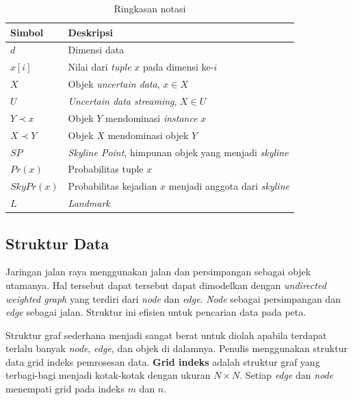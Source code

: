 \documentclass[conference]{IEEEtran}
\begin{document}
\begin{table}[htbp]
	\caption{Ringkasan notasi}
	\begin{center}
		\begin{tabular}{| p{2cm} | p{5cm} |}
		\hline
		\textbf{Simbol} & \textbf{Deskripsi} \\ \hline
		$ d $ & Dimensi data \\ \hline
		$ x[i] $ & Nilai dari \textit{tuple} $ x $ pada dimensi ke-$ i $  \\ \hline
		$ X $ & Objek \textit{uncertain data}, $ x \in X $ \\ \hline
		$ U $ & \textit{Uncertain data streaming}, $ X \in U $ \\ \hline
		$ Y \prec x $ & Objek $ Y $ mendominasi \textit{instance} $ x $ \\ \hline
		$ X \prec Y $ & Objek $ X $ mendominasi objek $ Y $ \\ \hline
		$ SP $ & \textit{Skyline Point}, himpunan objek yang menjadi \textit{skyline} \\ \hline
		$ Pr(x) $ & Probabilitas tuple $ x $ \\ \hline
		$ SkyPr(x) $ & Probabilitas kejadian $ x $ menjadi anggota dari \textit{skyline} \\ \hline
		$ L $ & \textit{Landmark} \\
		\hline
		\end{tabular}
		\label{tab:istilah-bab3}
	\end{center}
\end{table}

\subsection{Struktur Data}
Jaringan jalan raya menggunakan jalan dan persimpangan sebagai objek utamanya. Hal tersebut dapat tersebut dapat dimodelkan dengan \textit{undirected weighted graph} yang terdiri dari \textit{node} dan \textit{edge}. \textit{Node} sebagai persimpangan dan \textit{edge} sebagai jalan. Struktur ini efisien untuk pencarian data pada peta.

Struktur graf sederhana menjadi sangat berat untuk diolah apabila terdapat terlalu banyak \textit{node}, \textit{edge}, dan objek di dalamnya. Penulis menggunakan struktur data grid indeks pemrosesan data. \textbf{Grid indeks} adalah struktur graf yang terbagi-bagi menjadi kotak-kotak dengan ukuran $ N \times N $. Setiap \textit{edge} dan \textit{node} menempati grid pada indeks $ m $ dan $ n $.
\end{document}
